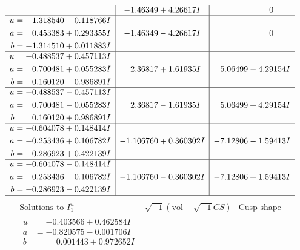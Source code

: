 \documentclass[1p]{elsarticle_modified}
\theoremstyle{definition}
\newcommand{\I}{\sqrt{-1}}
\begin{document}
$$\begin{array}{c|c|c}
 & -1.46349 + 4.26617 I & \phantom{-0.000000 } 0 \\ \hline\begin{aligned}
u &= -1.318540 - 0.118766 I \\
a &= \phantom{-}0.453383 + 0.293355 I \\
b &= -1.314510 + 0.011883 I\end{aligned}
 & -1.46349 - 4.26617 I & \phantom{-0.000000 } 0 \\ \hline\begin{aligned}
u &= -0.488537 + 0.457113 I \\
a &= \phantom{-}0.700481 + 0.055283 I \\
b &= \phantom{-}0.160120 - 0.986891 I\end{aligned}
 & \phantom{-}2.36817 + 1.61935 I & \phantom{-}5.06499 - 4.29154 I \\ \hline\begin{aligned}
u &= -0.488537 - 0.457113 I \\
a &= \phantom{-}0.700481 - 0.055283 I \\
b &= \phantom{-}0.160120 + 0.986891 I\end{aligned}
 & \phantom{-}2.36817 - 1.61935 I & \phantom{-}5.06499 + 4.29154 I \\ \hline\begin{aligned}
u &= -0.604078 + 0.148414 I \\
a &= -0.253436 + 0.106782 I \\
b &= -0.286923 + 0.422139 I\end{aligned}
 & -1.106760 + 0.360302 I & -7.12806 - 1.59413 I \\ \hline\begin{aligned}
u &= -0.604078 - 0.148414 I \\
a &= -0.253436 - 0.106782 I \\
b &= -0.286923 - 0.422139 I\end{aligned}
 & -1.106760 - 0.360302 I & -7.12806 + 1.59413 I\\
 \hline 
 \end{array}$$\newpage$$\begin{array}{c|c|c}  
\text{Solutions to }I^u_{1}& \I (\text{vol} + \sqrt{-1}CS) & \text{Cusp shape}\\
 \hline 
\begin{aligned}
u &= -0.403566 + 0.462584 I \\
a &= -0.820575 - 0.001706 I \\
b &= \phantom{-}0.001443 + 0.972652 I\end{aligned}

\end{array}$$
\end{document}
